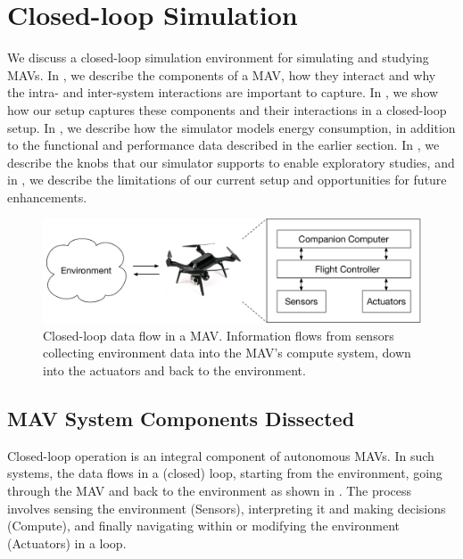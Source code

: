 %

\section{Closed-loop Simulation}
\label{sec:simulation}

We discuss a closed-loop simulation environment for simulating and studying MAVs. In , we describe the components of a MAV, how they interact and why the intra- and inter-system interactions are important to capture. In , we show how our setup captures these components and their interactions in a closed-loop setup. In , we describe how the simulator models energy consumption, in addition to the functional and performance data described in the earlier section. In , we describe the knobs that our simulator supports to enable exploratory studies, and in , we describe the limitations of our current setup and opportunities for future enhancements. 
 
\begin{figure}[t!]
\centering
\includegraphics[trim=0 0 0 -25, clip, width=0.9\linewidth]{figs/Aerial_agent_3}
\caption{Closed-loop data flow in a MAV. Information flows from sensors collecting environment data into the MAV's compute system, down into the actuators and back to the environment.}
\label{fig:Aerial_agent_data_flow}
\end{figure}

\subsection{MAV System Components Dissected}
\label{sec:components}

Closed-loop operation is an integral component of autonomous MAVs. In such systems, the data flows in a (closed) loop, starting from the environment, going through the MAV and back to the environment as shown in . The process involves sensing the environment (Sensors), interpreting it and making decisions (Compute), and finally navigating within or modifying the environment (Actuators) in a loop. 

